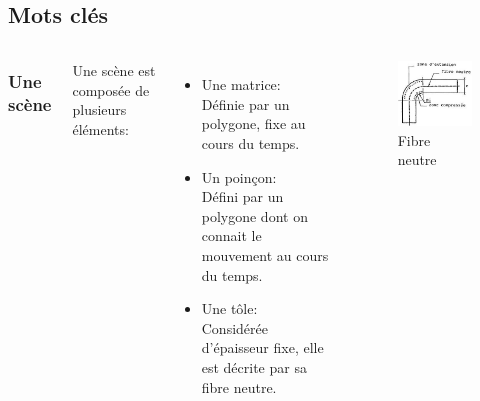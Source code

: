 \documentclass{beamer}
\begin{document}
\subsection{Mots clés}
\begin{frame}
    \begin{columns}
        \frametitle{Une scène}
        Une scène est composée de plusieurs éléments:
        \begin{itemize}
            \item Une matrice:\\
                Définie par un polygone, fixe au cours du temps.
            \item Un poinçon:\\
                Défini par un polygone dont on connait le mouvement au cours du temps.
            \item Une tôle:\\
                Considérée d'épaisseur fixe, elle est décrite par sa fibre neutre.
        \end{itemize}
        \begin{figure}
            \includegraphics[width=\textwidth]{img/fibreNeutre.jpg}
            \caption{Fibre neutre}
            \label{FibreNeudre}
        \end{figure}
    \end{columns}
\end{frame}
\end{document}
